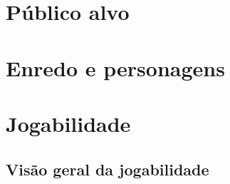 \documentclass[12pt,a4paper]{article}
\begin{document}
\section{Público alvo}


\section{Enredo e personagens}






\section{Jogabilidade}

\subsection{Visão geral da jogabilidade}

\end{document}
